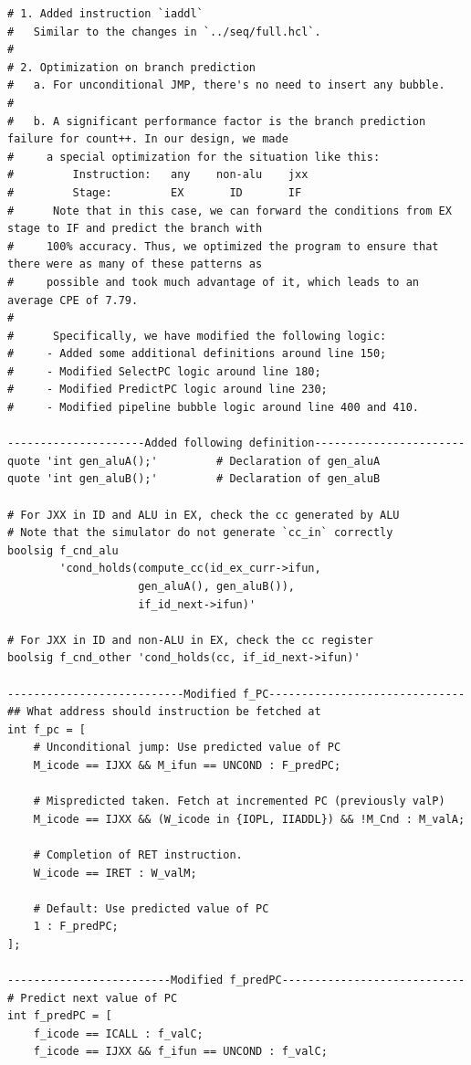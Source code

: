 \documentclass[12pt,a4paper]{article}
\begin{document}
\begin{lstlisting} 
# 1. Added instruction `iaddl`
#   Similar to the changes in `../seq/full.hcl`.
#
# 2. Optimization on branch prediction
#   a. For unconditional JMP, there's no need to insert any bubble.
#
#   b. A significant performance factor is the branch prediction failure for count++. In our design, we made
#     a special optimization for the situation like this:
#         Instruction:   any    non-alu    jxx
#         Stage:         EX       ID       IF
#      Note that in this case, we can forward the conditions from EX stage to IF and predict the branch with
#     100% accuracy. Thus, we optimized the program to ensure that there were as many of these patterns as
#     possible and took much advantage of it, which leads to an average CPE of 7.79.
#
#      Specifically, we have modified the following logic:
#     - Added some additional definitions around line 150;
#     - Modified SelectPC logic around line 180;
#     - Modified PredictPC logic around line 230;
#     - Modified pipeline bubble logic around line 400 and 410.

---------------------Added following definition-----------------------
quote 'int gen_aluA();'			# Declaration of gen_aluA
quote 'int gen_aluB();'			# Declaration of gen_aluB

# For JXX in ID and ALU in EX, check the cc generated by ALU
# Note that the simulator do not generate `cc_in` correctly
boolsig f_cnd_alu 
        'cond_holds(compute_cc(id_ex_curr->ifun, 
                    gen_aluA(), gen_aluB()), 
                    if_id_next->ifun)'

# For JXX in ID and non-ALU in EX, check the cc register
boolsig f_cnd_other 'cond_holds(cc, if_id_next->ifun)'

---------------------------Modified f_PC------------------------------
## What address should instruction be fetched at
int f_pc = [
	# Unconditional jump: Use predicted value of PC
	M_icode == IJXX && M_ifun == UNCOND : F_predPC;

	# Mispredicted taken. Fetch at incremented PC (previously valP)
	M_icode == IJXX && (W_icode in {IOPL, IIADDL}) && !M_Cnd : M_valA;

	# Completion of RET instruction.
	W_icode == IRET : W_valM;

	# Default: Use predicted value of PC
	1 : F_predPC;
];

-------------------------Modified f_predPC----------------------------
# Predict next value of PC
int f_predPC = [
	f_icode == ICALL : f_valC;
	f_icode == IJXX && f_ifun == UNCOND : f_valC;


\end{lstlisting}
\end{document}
